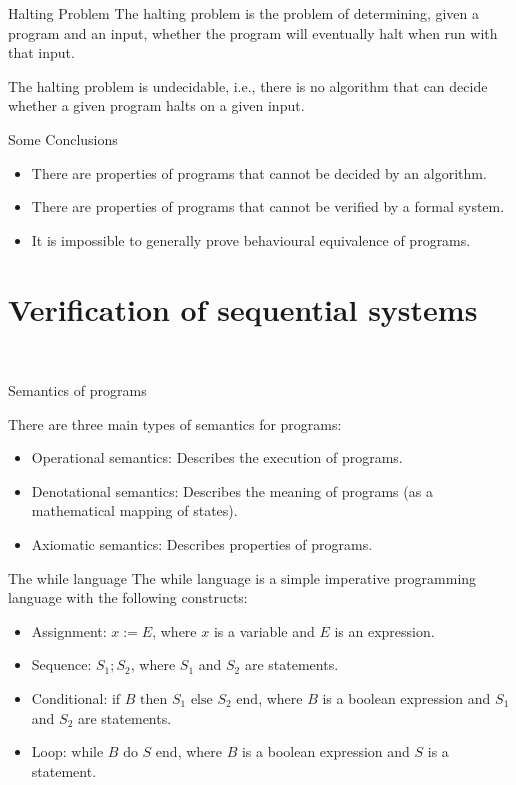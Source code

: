 \documentclass{beamer}
\begin{document}
        \begin{frame}{Halting Problem}
          The halting problem is the problem of determining, given a program and an input, whether the program will eventually halt when run with that input.
          
          The halting problem is undecidable, i.e., there is no algorithm that can decide whether a given program halts on a given input.
        \end{frame}

        \begin{frame}{Some Conclusions}
          \begin{itemize}
            \item There are properties of programs that cannot be decided by an algorithm. 
            \item There are properties of programs that cannot be verified by a formal system.
            \item It is impossible to generally prove behavioural equivalence of programs.
          \end{itemize}
        
          
        \end{frame}
\section{Verification of sequential systems}\

\begin{frame}{Semantics of programs}

  There are three main types of semantics for programs:
  \begin{itemize}
  \item Operational semantics: Describes the execution of programs.
  \item Denotational semantics: Describes the meaning of programs (as a mathematical mapping of states).
  \item Axiomatic semantics: Describes properties of programs.
  \end{itemize}
  \end{frame}
  \begin{frame}{The while language}
    The while language is a simple imperative programming language with the following constructs:
    \begin{itemize}
    \item Assignment: $x:=E$, where $x$ is a variable and $E$ is an expression.
    \item Sequence: $S_1;S_2$, where $S_1$ and $S_2$ are statements.
    \item Conditional: $\text{if }B\text{ then }S_1\text{ else }S_2\text{ end}$, where $B$ is a boolean expression and $S_1$ and $S_2$ are statements.
    \item Loop: $\text{while }B\text{ do }S\text{ end}$, where $B$ is a boolean expression and $S$ is a statement.
    \end{itemize}
    \end{frame}
\end{document}
